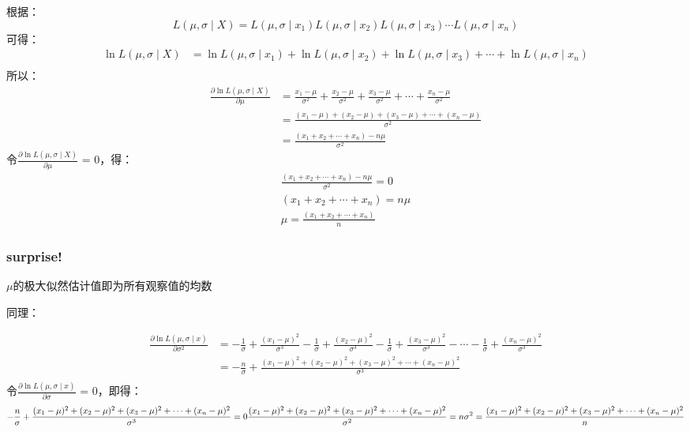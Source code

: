\documentclass[
]{article}
\begin{document}
根据：
\[L(\mu,\sigma \mid X)=L(\mu,\sigma \mid x_1)L(\mu,\sigma \mid x_2)L(\mu,\sigma \mid x_3) \cdots L(\mu,\sigma \mid x_n)\]
可得： \[
\begin{align}
\ln L(\mu,\sigma \mid X)&=\ln L(\mu,\sigma \mid x_1)+\ln L(\mu,\sigma \mid x_2)+\ln L(\mu,\sigma \mid x_3)+\cdots+\ln L(\mu,\sigma \mid x_n) \\
\end{align}
\] 所以： \[
\begin{align}
\frac{\partial{\ln L(\mu,\sigma \mid X)}}{\partial{\mu}} &= \frac{x_1-\mu}{\sigma^2} + \frac{x_2-\mu}{\sigma^2} + \frac{x_3-\mu}{\sigma^2} + \cdots + \frac{x_n-\mu}{\sigma^2} \\
&= \frac{(x_1-\mu) + (x_2-\mu) + (x_3-\mu) + \cdots + (x_n-\mu)}{\sigma^2} \\
&= \frac{(x_1+ x_2 + \cdots + x_n) - n\mu}{\sigma^2}
\end{align}
\] 令\(\frac{\partial{\ln L(\mu,\sigma \mid X)}}{\partial{\mu}}\) =
0，得： \[
\begin{align}
\frac{(x_1+ x_2 + \cdots + x_n) - n\mu}{\sigma^2} = 0 \\
(x_1+ x_2 + \cdots + x_n) = n\mu \\
\mu = \frac{(x_1+ x_2 + \cdots + x_n)}{n}
\end{align}
\]

\subsubsection{surprise!}\label{surprise}

\(\mu\)的极大似然估计值即为所有观察值的均数

同理：

\[
\begin{align}
\frac{\partial{\ln L(\mu,\sigma \mid x)}}{\partial{\sigma^2}}
&= -\frac{1}{\sigma}+\frac{(x_1-\mu)^2}{\sigma^3} -\frac{1}{\sigma}+\frac{(x_2-\mu)^2}{\sigma^3} -\frac{1}{\sigma}+\frac{(x_3-\mu)^2}{\sigma^3} - \cdots -\frac{1}{\sigma}+\frac{(x_n-\mu)^2}{\sigma^3} \\
&= -\frac{n}{\sigma} + \frac{(x_1-\mu)^2+(x_2-\mu)^2+(x_3-\mu)^2+\cdots+(x_n-\mu)^2}{\sigma^3}\\
\end{align}
\] 令\(\frac{\partial{\ln L(\mu,\sigma \mid x)}}{\partial{\sigma}}\) =
0，即得： \[
-\frac{n}{\sigma} + \frac{(x_1-\mu)^2+(x_2-\mu)^2+(x_3-\mu)^2+\cdots+(x_n-\mu)^2}{\sigma^3} = 0 \\
\frac{(x_1-\mu)^2+(x_2-\mu)^2+(x_3-\mu)^2+\cdots+(x_n-\mu)^2}{\sigma^2} = n \\
\sigma^2 = \frac{(x_1-\mu)^2+(x_2-\mu)^2+(x_3-\mu)^2+\cdots+(x_n-\mu)^2}{n}
\]
\end{document}
